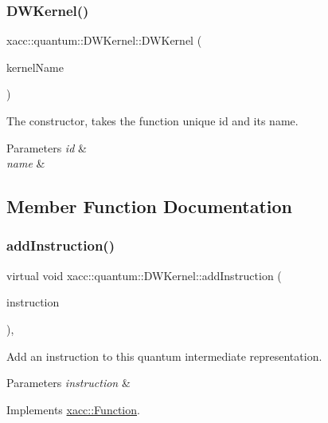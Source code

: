 \subsubsection{\texorpdfstring{D\+W\+Kernel()}{DWKernel()}}
{\footnotesize\ttfamily xacc\+::quantum\+::\+D\+W\+Kernel\+::\+D\+W\+Kernel (\begin{DoxyParamCaption}\item[{std\+::string}]{kernel\+Name }\end{DoxyParamCaption})\hspace{0.3cm}{\ttfamily [inline]}}

The constructor, takes the function unique id and its name.


\begin{DoxyParams}{Parameters}
{\em id} & \\
\hline
{\em name} & \\
\hline
\end{DoxyParams}


\subsection{Member Function Documentation}
\mbox{\label{a01221_a4c3043d6971999c3a09e797fc55deb6c}} 
\subsubsection{\texorpdfstring{add\+Instruction()}{addInstruction()}}
{\footnotesize\ttfamily virtual void xacc\+::quantum\+::\+D\+W\+Kernel\+::add\+Instruction (\begin{DoxyParamCaption}\item[{Inst\+Ptr}]{instruction }\end{DoxyParamCaption})\hspace{0.3cm}{\ttfamily [inline]}, {\ttfamily [virtual]}}

Add an instruction to this quantum intermediate representation.


\begin{DoxyParams}{Parameters}
{\em instruction} & \\
\hline
\end{DoxyParams}


Implements \hyperlink{a01653_aa8c9ec2d08be75c69399d4254b0216f5}{xacc\+::\+Function}.

